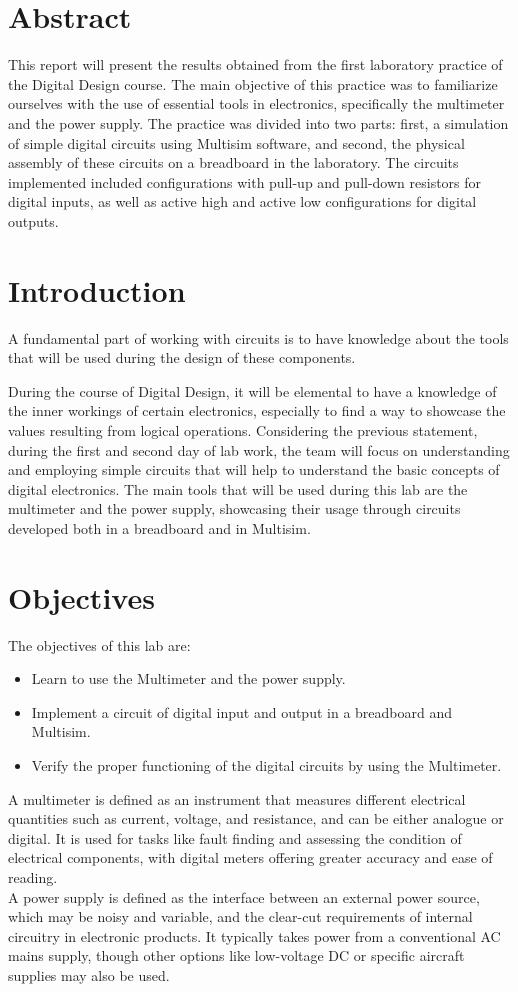 \documentclass[12pt]{article}  %
\begin{document}
\section{Abstract} %
This report will present the results obtained from the first laboratory practice of the Digital Design course. The main objective of this practice was to familiarize ourselves with the use of essential tools in electronics, specifically the multimeter and the power supply. The practice was divided into two parts: first, a simulation of simple digital circuits using Multisim software, and second, the physical assembly of these circuits on a breadboard in the laboratory. The circuits implemented included configurations with pull-up and pull-down resistors for digital inputs, as well as active high and active low configurations for digital outputs. 
\section{Introduction} %
A fundamental part of working with circuits is to have knowledge about the tools that will be used during the design of these components.

During the course of Digital Design, it will be elemental to have a knowledge of the inner workings of certain electronics, 
especially to find a way to showcase the values resulting from logical operations. Considering the previous statement, during the first and second day of lab work, 
the team will focus on understanding and employing simple circuits that will help to understand the basic concepts of digital electronics. 
The main tools that will be used during this lab are the multimeter and the power supply, showcasing their usage through circuits developed both in a breadboard and in Multisim.
\section{Objectives} %
The objectives of this lab are:
\begin{itemize}
  \item Learn to use the Multimeter and the power supply.
  \item Implement a circuit of digital input and output in a breadboard and Multisim.
  \item Verify the proper functioning of the digital circuits by using the Multimeter.
\end{itemize}
A multimeter is defined as an instrument that measures different electrical quantities such as current, voltage, and resistance, and can be either analogue or digital. It is used for tasks like fault finding and assessing the condition of electrical components, with digital meters offering greater accuracy and ease of reading. \cite{SDMultimeter}
\\A power supply is defined as the interface between an external power source, which may be noisy and variable, and the clear-cut requirements of internal circuitry in electronic products. It typically takes power from a conventional AC mains supply, though other options like low-voltage DC or specific aircraft supplies may also be used. \cite{SDPowerSupply}
\end{document}

